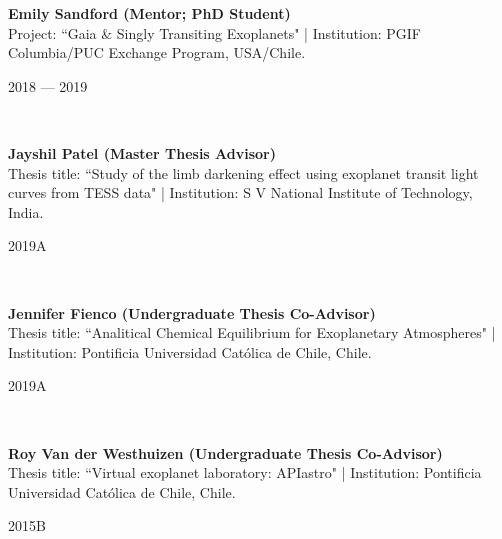 \documentclass[12pt, a4paper]{article} %
\begin{document}
\begin{minipage}[t]{0.7\textwidth}
\begin{flushleft}%
  \setlength{\leftskip}{0.2cm}%
\textbf{Emily Sandford (Mentor; PhD Student)}\\
Project: ``Gaia \& Singly Transiting Exoplanets" | Institution: PGIF Columbia/PUC Exchange Program, USA/Chile.
\end{flushleft}
\end{minipage}
\begin{minipage}[t]{0.3\textwidth}
\hfill 2018 --- 2019
\end{minipage}\\

\begin{minipage}[t]{0.7\textwidth}
\begin{flushleft}%
  \setlength{\leftskip}{0.2cm}%
\textbf{Jayshil Patel (Master Thesis Advisor)}\\
Thesis title: ``Study of the limb darkening effect using exoplanet transit light curves from TESS data" | Institution: S V National Institute of Technology, India.
\end{flushleft}
\end{minipage}
\begin{minipage}[t]{0.3\textwidth}
\hfill 2019A
\end{minipage}\\

\begin{minipage}[t]{0.7\textwidth}
\begin{flushleft}%
  \setlength{\leftskip}{0.2cm}%
\textbf{Jennifer Fienco (Undergraduate Thesis Co-Advisor)}\\
Thesis title: ``Analitical Chemical Equilibrium for Exoplanetary Atmospheres" | Institution: Pontificia Universidad Cat\'olica de Chile, Chile.
\end{flushleft}
\end{minipage}
\begin{minipage}[t]{0.3\textwidth}
\hfill 2019A
\end{minipage}\\

\begin{minipage}[t]{0.7\textwidth}
\begin{flushleft}%
  \setlength{\leftskip}{0.2cm}%
\textbf{Roy Van der Westhuizen (Undergraduate Thesis Co-Advisor)}\\
Thesis title: ``Virtual exoplanet laboratory: APIastro" | Institution: Pontificia Universidad Cat\'olica de Chile, Chile.
\end{flushleft}
\end{minipage}
\begin{minipage}[t]{0.3\textwidth}
\hfill 2015B
\end{minipage}
\end{document}
